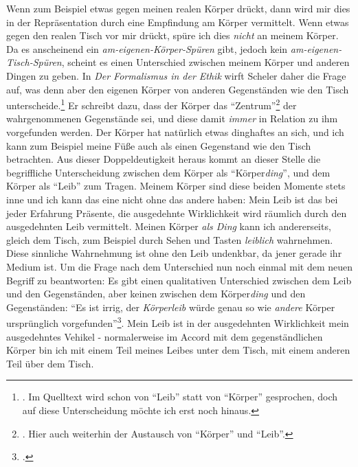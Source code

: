 \documentclass[a4paper, 12pt]{article}
\begin{document}
\begin{onehalfspace}
Wenn zum Beispiel etwas gegen meinen realen Körper drückt, dann wird mir dies in der Repräsentation durch eine Empfindung am Körper vermittelt. Wenn etwas gegen den realen Tisch vor mir drückt, spüre ich dies \emph{nicht} an meinem Körper. Da es anscheinend ein \emph{am-eigenen-Körper-Spüren} gibt, jedoch kein \emph{am-eigenen-Tisch-Spüren}, scheint es einen Unterschied zwischen meinem Körper und anderen Dingen zu geben. In \emph{Der Formalismus in der Ethik} wirft Scheler daher die Frage auf, was denn aber den eigenen Körper von anderen Gegenständen wie den Tisch unterscheide.\footnote{\Cite[Vgl.][S. 498]{scheler-ethik}. Im Quelltext wird schon von "`Leib"' statt von "`Körper"' gesprochen, doch auf diese Unterscheidung möchte ich erst noch hinaus.} Er schreibt dazu, dass der Körper das "`Zentrum"'\footnote{\Cite[Vgl.][S. 498]{scheler-ethik}. Hier auch weiterhin der Austausch von "`Körper"' und "`Leib"'.} der wahrgenommenen Gegenstände sei, und diese damit \emph{immer} in Relation zu ihm vorgefunden werden. Der Körper hat natürlich etwas dinghaftes an sich, und ich kann zum Beispiel meine Füße auch als einen Gegenstand wie den Tisch betrachten. Aus dieser Doppeldeutigkeit heraus kommt an dieser Stelle die begriffliche Unterscheidung zwischen dem Körper als "`Körper\emph{ding}"', und dem Körper als "`Leib"' zum Tragen. Meinem Körper sind diese beiden Momente stets inne und ich kann das eine nicht ohne das andere haben: Mein Leib ist das bei jeder Erfahrung Präsente, die ausgedehnte Wirklichkeit wird räumlich durch den ausgedehnten Leib vermittelt. Meinen Körper \emph{als Ding} kann ich andererseits, gleich dem Tisch, zum Beispiel durch Sehen und Tasten \emph{leiblich} wahrnehmen. Diese sinnliche Wahrnehmung ist ohne den Leib undenkbar, da jener gerade ihr Medium ist. Um die Frage nach dem Unterschied nun noch einmal mit dem neuen Begriff zu beantworten: Es gibt einen qualitativen Unterschied zwischen dem Leib und den Gegenständen, aber keinen zwischen dem Körper\emph{ding} und den Gegenständen: "`Es ist irrig, der \emph{Körperleib} würde genau so wie \emph{andere} Körper ursprünglich vorgefunden"'\footnote{\Cite[Siehe][S. 494]{scheler-ethik}.}. Mein Leib ist in der ausgedehnten Wirklichkeit mein ausgedehntes Vehikel - normalerweise im Accord mit dem gegenständlichen Körper bin ich mit einem Teil meines Leibes unter dem Tisch, mit einem anderen Teil über dem Tisch. 



\end{onehalfspace}
\end{document}
